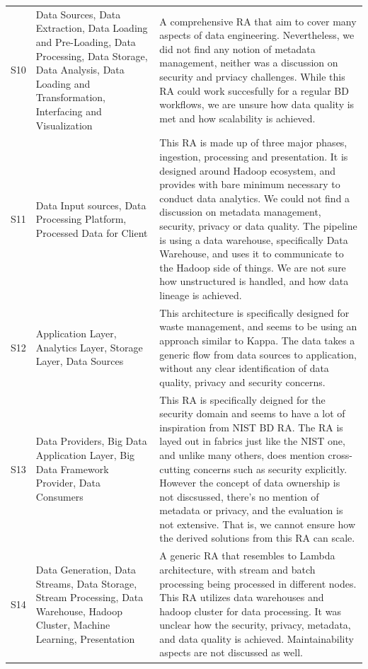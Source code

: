 \documentclass[review]{elsarticle}
\begin{document}
\begin{table}[h!]
\begin{tabular}{ |p{0.5cm}|p{3cm}|p{7.5cm}| }
        \hline
        S10 & Data Sources, Data Extraction, Data Loading and Pre-Loading, Data Processing, Data Storage, Data Analysis, Data Loading and Transformation, Interfacing and Visualization &  A comprehensive RA that aim to cover many aspects of data engineering. Nevertheless, we did not find any notion of metadata management, neither was a discussion on security and prviacy challenges. While this RA could work succesfully for a regular BD workflows, we are unsure how data quality is met and how scalability is achieved.  \\
        S11 & Data Input sources, Data Processing Platform, Processed Data for Client &  This RA is made up of three major phases, ingestion, processing and presentation. It is designed around Hadoop ecosystem, and provides with bare minimum necessary to conduct data analytics. We could not find a discussion on metadata management, security, privacy or data quality. The pipeline is using a data warehouse, specifically Data Warehouse, and uses it to communicate to the Hadoop side of things. We are not sure how unstructured is handled, and how data lineage is achieved.  \\
        \hline
        S12 & Application Layer, Analytics Layer, Storage Layer, Data Sources & This architecture is specifically designed for waste management, and seems to be using an approach similar to Kappa. The data takes a generic flow from data sources to application, without any clear identification of data quality, privacy and security concerns.    \\
        \hline
        S13 & Data Providers, Big Data Application Layer, Big Data Framework Provider, Data Consumers & This RA is specifically deigned for the security domain and seems to have a lot of inspiration from NIST BD RA. The RA is layed out in fabrics just like the NIST one, and unlike many others, does mention cross-cutting concerns such as security explicitly. However the concept of data ownership is not discsussed, there's no mention of metadata or privacy, and the evaluation is not extensive. That is, we cannot ensure how the derived solutions from this RA can scale.    \\
        \hline
        S14 & Data Generation, Data Streams, Data Storage, Stream Processing, Data Warehouse, Hadoop Cluster, Machine Learning, Presentation & A generic RA that resembles to Lambda architecture, with stream and batch processing being processed in different nodes. This RA utilizes data warehouses and hadoop cluster for data processing. It was unclear how the security, privacy, metadata, and data quality is achieved. Maintainability aspects are not discussed as well. \\

\end{tabular}
\end{table}
\end{document}
